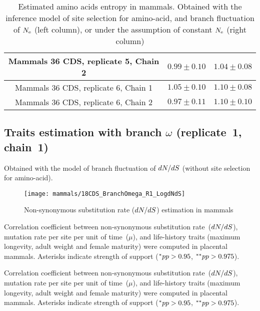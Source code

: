 \begin{table}[H]
{\begin{tabu}{|c|c|c|}
        Mammals 36 CDS, replicate 5, Chain 2 & $0.99 \pm 0.10$ & $1.04 \pm 0.08$\\ \hline
        Mammals 36 CDS, replicate 6, Chain 1 & $1.05 \pm 0.10$ & $1.10 \pm 0.08$\\ \hline
        Mammals 36 CDS, replicate 6, Chain 2 & $0.97 \pm 0.11$ & $1.10 \pm 0.10$\\ \hline
    \end{tabu}}
    \caption[Entropy of amino acids in mammals]{Estimated amino acids entropy in mammals.
    Obtained with the inference model of site selection for amino-acid, and branch fluctuation of $N_{\mathrm{e}}$ (left column), or under the assumption of constant $N_{\mathrm{e}}$ (right column)}
    \label{tab:table-entropy-aa-mutselne}
\end{table}

\subsection{Traits estimation with branch \texorpdfstring{$\omega$}{ω} (replicate~1, chain~1)}
Obtained with the model of branch fluctuation of $\dnds$ (without site selection for amino-acid).

\begin{figure}[H]
    \centering
    \texttt{[image: mammals/18CDS\_BranchOmega\_R1\_LogdNdS]}
    \caption[$\dnds$ estimation in mammals]{{Non-synonymous substitution} rate ($\dnds$) estimation in mammals}
\end{figure}

\begin{table}[H]
    
    \caption[Correlation coefficient matrix in mammals ($\dnds$)]{
    Correlation coefficient between non-synonymous substitution rate~($\dnds$), mutation rate per site per unit of time~($\mu$), and life-history traits (maximum longevity, adult weight and female maturity) were computed in placental mammals.
    Asterisks indicate strength of support ($\smash{^{*}} pp > 0.95$, $\smash{^{**}} pp > 0.975$).}
\end{table}

\begin{table}[H]
    
    \caption[Covariance matrix in mammals ($\dnds$)]{
    Correlation coefficient between non-synonymous substitution rate~($\dnds$), mutation rate per site per unit of time~($\mu$), and life-history traits (maximum longevity, adult weight and female maturity) were computed in placental mammals.
    Asterisks indicate strength of support ($\smash{^{*}} pp > 0.95$, $\smash{^{**}} pp > 0.975$).}
\end{table}


